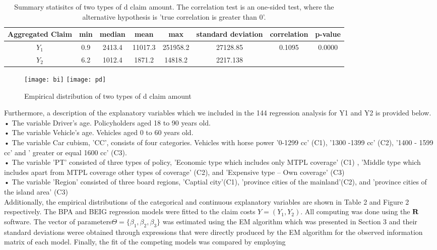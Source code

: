 \documentclass[12pt]{article}%
\theoremstyle{definition}
\theoremstyle{remark}
\begin{document}
{\begin{table}[H]
	\begin{center}
		\caption{ Summary statisitcs of two types of d claim amount. The correlation test is an one-sided test,
			where the alternative hypothesis is ’true correlation is greater than 0’.}
		\label{tab:Table1.}
		\footnotesize{
		\begin{tabular}{cccccccc} %
			\hline
			\textbf{Aggregated Claim} & \textbf{min} & \textbf{median}& \textbf{mean}& \textbf{max}&\textbf{standard deviation}& \textbf{correlation}&\textbf{p-value} \\
			\hline
			$Y_1$ &  0.9& 2413.4& 11017.3& 251958.2& 27128.85&\multirow{2}{*}{0.1095}&\multirow{2}{*}{0.0000}\\
			$Y_2$ & 6.2& 1012.4& 1871.2& 14818.2& 2217.138 & \\
		\hline
		\end{tabular}}
	\end{center}
\end{table}
\begin{figure}[htp]
	\centering
	\texttt{[image: bi]}
	\texttt{[image: pd]}
	\caption{ Empirical distribution of two types of d claim amount}
\end{figure}
Furthermore, a description of the explanatory variables which we included in the 144
regression analysis for Y1 and Y2 is provided below.\\ 
• The variable Driver’s age. Policyholders aged 18 to 90 years old.\\ 
• The variable Vehicle’s age. Vehicles aged 0 to 60 years old. \\
• The variable Car cubism, ’CC’, consists of four categories. Vehicles with horse power 
’0-1299 cc’ (C1), ’1300 -1399 cc’ (C2), ’1400 - 1599 cc’ and ’ greater or equal 1600 cc’ (C3).\\ 
• The variable ’PT’ consisted of three types of policy, ’Economic type which includes 
only MTPL coverage’ (C1) , ’Middle type which includes apart from MTPL coverage 
other types of coverage’ (C2), and ’Expensive type – Own coverage’ (C3)\\ 
• The variable ’Region’ consisted of three board regions, ’Captial city’(C1), ’province 
cities of the mainland’(C2), and ’province cities of the island area’ (C3) \\

Additionally, the empirical distributions of the categorical and continuous explanatory 
variables are shown in Table 2 and Figure 2 respectively. The BPA and BEIG regression 
models were fitted to the claim costs $Y = (Y_1, Y_2)$. All computing was done using the $\bold{R}$ 
software. The vector of parameters$ \Theta = \{\beta_{1}
	, \beta_{2}
	, \beta_{3}\}$ was estimated using the EM algorithm 
which was presented in Section 3 and their standard deviations weree obtained through 
expressions that were directly produced by the EM algorithm for the observed information 
matrix of each model. Finally, the fit of the competing models was compared by employing\\\\


}
\end{document}
